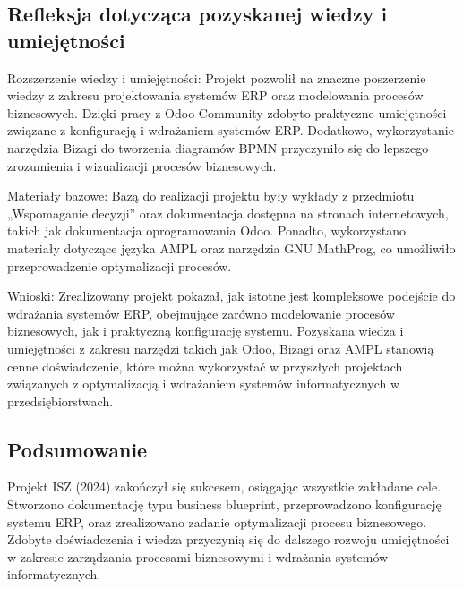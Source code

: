 \subsection{Refleksja dotycząca pozyskanej wiedzy i umiejętności}

Rozszerzenie wiedzy i umiejętności:
Projekt pozwolił na znaczne poszerzenie wiedzy z zakresu projektowania systemów ERP oraz modelowania procesów biznesowych. Dzięki pracy z Odoo Community zdobyto praktyczne umiejętności związane z konfiguracją i wdrażaniem systemów ERP. Dodatkowo, wykorzystanie narzędzia Bizagi do tworzenia diagramów BPMN przyczyniło się do lepszego zrozumienia i wizualizacji procesów biznesowych.

Materiały bazowe:
Bazą do realizacji projektu były wykłady z przedmiotu „Wspomaganie decyzji” oraz dokumentacja dostępna na stronach internetowych, takich jak dokumentacja oprogramowania Odoo. Ponadto, wykorzystano materiały dotyczące języka AMPL oraz narzędzia GNU MathProg, co umożliwiło przeprowadzenie optymalizacji procesów.

Wnioski:
Zrealizowany projekt pokazał, jak istotne jest kompleksowe podejście do wdrażania systemów ERP, obejmujące zarówno modelowanie procesów biznesowych, jak i praktyczną konfigurację systemu. Pozyskana wiedza i umiejętności z zakresu narzędzi takich jak Odoo, Bizagi oraz AMPL stanowią cenne doświadczenie, które można wykorzystać w przyszłych projektach związanych z optymalizacją i wdrażaniem systemów informatycznych w przedsiębiorstwach.

\subsection{Podsumowanie}

Projekt ISZ (2024) zakończył się sukcesem, osiągając wszystkie zakładane cele. Stworzono dokumentację typu business blueprint, przeprowadzono konfigurację systemu ERP, oraz zrealizowano zadanie optymalizacji procesu biznesowego. Zdobyte doświadczenia i wiedza przyczynią się do dalszego rozwoju umiejętności w zakresie zarządzania procesami biznesowymi i wdrażania systemów informatycznych.

